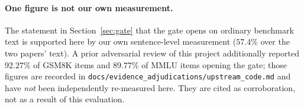 \paragraph{One figure is not our own measurement.} The statement in
Section~\ref{sec:gate} that the gate opens on ordinary benchmark text is
supported here by our own sentence-level measurement ($57.4\%$ over the two
papers' text). A prior adversarial review of this project additionally reported
$92.27\%$ of GSM8K items and $89.77\%$ of MMLU items opening the gate; those
figures are recorded in \texttt{docs/evidence\_adjudications/upstream\_code.md}
and have \emph{not} been independently re-measured here. They are cited as
corroboration, not as a result of this evaluation.


